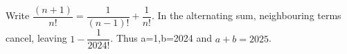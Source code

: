 Write $\dfrac{(n+1)}{n!}=\dfrac{1}{(n-1)!}+\dfrac{1}{n!}$. In the alternating sum, neighbouring terms cancel, leaving $1-\dfrac{1}{2024!}$. Thus a=1,b=2024 and $a+b=\boxed{2025}$.

